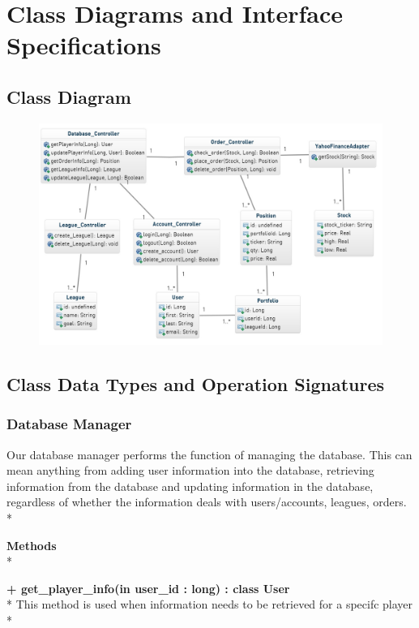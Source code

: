\chapter{Class Diagrams and Interface Specifications}

\section{Class Diagram}
\begin{figure}[h]
\centering
\includegraphics[width=5.5in]{./img/classDiagram.jpg}
\end{figure}


\clearpage

\section{Class Data Types and Operation Signatures}

\subsection{Database Manager}
Our database manager performs the function of managing the database. This can
mean anything from adding user information into the database, retrieving
information from the database and updating information in the database,
regardless of whether the information deals with users/accounts, leagues,
orders. \\*

{\bfseries Methods} \\*

{\bfseries + get_player_info(in user_id : long) : class User } \\*
	This method is used when information needs to be retrieved for a specifc
  player \\*

